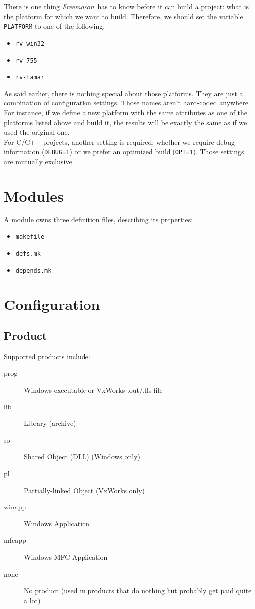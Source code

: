 \documentclass[a4paper]{article}
\newcommand{\freemason}{\textit{Freemason}}
\begin{document}
There is one thing \freemason\ has to know before it can build a project: what is the platform for which we want to build. Therefore,
we should set the variable \verb"PLATFORM" to one of the following:
\begin{itemize}
    \item \verb"rv-win32"
    \item \verb"rv-755"
    \item \verb"rv-tamar"
\end{itemize}
As said earlier, there is nothing special about those platforms. They are just a combination of configuration settings. Those names aren't
hard-coded anywhere. For instance, if we define a new platform with the same attributes as one of the platforms listed above and build it,
the results will be exactly the same as if we used the original one.
\\
For C/C++ projects, another setting is required: whether we require debug information (\verb"DEBUG=1") or we prefer
an optimized build (\verb"OPT=1"). Those settings are mutually exclusive.

\chapter{Modules}

A module owns three definition files, describing its properties:
\begin{itemize}
  \item{\verb"makefile"}
  \item{\verb"defs.mk"}
  \item{\verb"depends.mk"}
\end{itemize}


\chapter{Configuration}


\section{Product}
Supported products include:
\begin{description}
  \item[prog] Windows executable or VxWorks .out/.fls file
  \item[lib] Library (archive)
  \item[so] Shared Object (DLL) (Windows only)
  \item[pl] Partially-linked Object (VxWorks only)
  \item[winapp] Windows Application
  \item[mfcapp] Windows MFC Application
  \item[none] No product (used in products that do nothing but probably get paid quite a lot)
\end{description}
\end{document}
